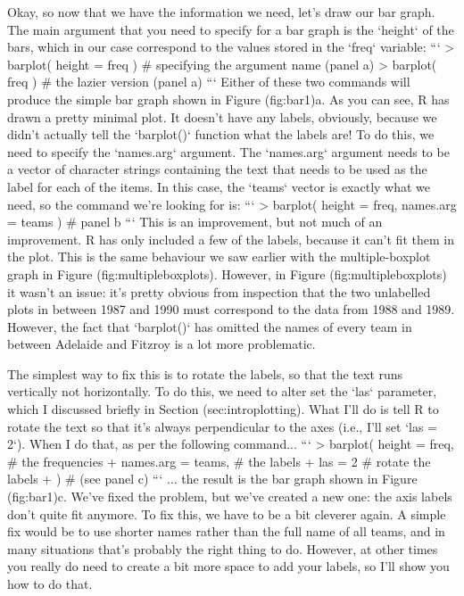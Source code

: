Okay, so now that we have the information we need, let's draw our bar graph. The main argument that you need to specify for a bar graph is the `height` of the bars, which in our case correspond to the values stored in the `freq` variable:
```
> barplot( height = freq )  # specifying the argument name (panel a)
> barplot( freq )   # the lazier version (panel a)
```
Either of these two commands will produce the simple bar graph shown in Figure \@ref(fig:bar1)a. As you can see, R has drawn a pretty minimal plot. It doesn't have any labels, obviously, because we didn't actually tell the `barplot()` function what the labels are! To do this, we need to specify the `names.arg` argument. The `names.arg` argument needs to be a vector of character strings containing the text that needs to be used as the label for each of the items. In this case, the `teams` vector is exactly what we need, so the command we're looking for is:
```
> barplot( height = freq, names.arg = teams )   # panel b
```
This is an improvement, but not much of an improvement. R has only included a few of the labels, because it can't fit them in the plot. This is the same behaviour we saw earlier with the multiple-boxplot graph in Figure \@ref(fig:multipleboxplots). However, in Figure \@ref(fig:multipleboxplots) it wasn't an issue: it's pretty obvious from inspection that the two unlabelled plots in between 1987 and 1990 must correspond to the data from 1988 and 1989. However, the fact that `barplot()` has omitted the names of every team in between Adelaide and Fitzroy is a lot more problematic. 

The simplest way to fix this is to rotate the labels, so that the text runs vertically not horizontally. To do this, we need to alter set the `las` parameter, which I discussed briefly in  Section \@ref(sec:introplotting). What I'll do is tell R to rotate the text so that it's always perpendicular to the axes (i.e., I'll set `las = 2`). When I do that, as per the following command...
```
> barplot( height = freq,      # the frequencies 
+          names.arg = teams,  # the labels
+          las = 2             # rotate the labels
+ )                            # (see panel c)
```
... the result is the bar graph shown in Figure \@ref(fig:bar1)c. We've fixed the problem, but we've created a new one:  the axis labels don't quite fit anymore. To fix this, we have to be a bit cleverer again. A simple fix would be to use shorter names rather than the full name of all teams, and in many situations that's probably the right thing to do. However, at other times you really do need to create a bit more space to add your labels, so I'll show you how to do that.

